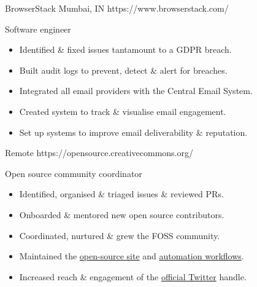 

\organisationsubsection
  {BrowserStack}
  {Mumbai, IN}
  {https://www.browserstack.com/}

\rolesubsubsection
  {Software engineer}
  {}

\begin{sectiondescription}
  \begin{itemize}[nosep, leftmargin = *]
    \item Identified \& fixed issues tantamount to a GDPR breach.
    \item Built audit logs to prevent, detect \& alert for breaches.
    \item Integrated all email providers with the Central Email System.
    \item Created system to track \& visualise email engagement.
    \item Set up systems to improve email deliverability \& reputation.
  \end{itemize}
\end{sectiondescription}


  {Remote}
  {https://opensource.creativecommons.org/}

\rolesubsubsection
  {Open source community coordinator}
  {}

\begin{sectiondescription}
  \begin{itemize}[nosep, leftmargin = *]
    \item Identified, organised \& triaged issues \& reviewed PRs.
    \item Onboarded \& mentored new open source contributors.
    \item Coordinated, nurtured \& grew the FOSS community.
    \item Maintained the \href{https://github.com/creativecommons/creativecommons.github.io-source/}{open-source site} and \href{https://github.com/creativecommons/ccos-scripts/}{automation workflows}.
    \item Increased reach \& engagement of the \href{https://twitter.com/cc_opensource}{official Twitter} handle.
  \end{itemize}
\end{sectiondescription}

